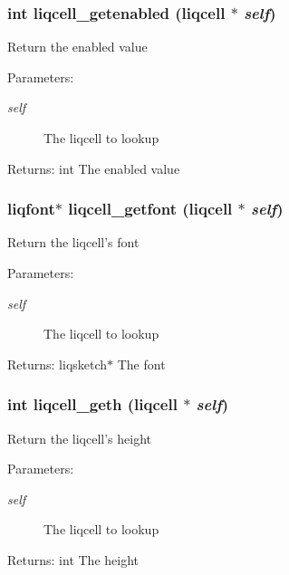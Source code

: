 \subsubsection[{liqcell\_\-getenabled}]{\setlength{\rightskip}{0pt plus 5cm}int liqcell\_\-getenabled (liqcell $\ast$ {\em self})}\label{d5/da2/liqcell_8c_1055023770b26ad7f54e37c5f8e201f5}


Return the enabled value \begin{Desc}
\item[Parameters:]
\begin{description}
\item[{\em self}]The liqcell to lookup \end{description}
\end{Desc}
\begin{Desc}
\item[Returns:]int The enabled value \end{Desc}
\subsubsection[{liqcell\_\-getfont}]{\setlength{\rightskip}{0pt plus 5cm}liqfont$\ast$ liqcell\_\-getfont (liqcell $\ast$ {\em self})}\label{d5/da2/liqcell_8c_4ba91871716343808c65b19ca8ae9ae4}


Return the liqcell's font \begin{Desc}
\item[Parameters:]
\begin{description}
\item[{\em self}]The liqcell to lookup \end{description}
\end{Desc}
\begin{Desc}
\item[Returns:]liqsketch$\ast$ The font \end{Desc}
\subsubsection[{liqcell\_\-geth}]{\setlength{\rightskip}{0pt plus 5cm}int liqcell\_\-geth (liqcell $\ast$ {\em self})}\label{d5/da2/liqcell_8c_f0cc7745df16dd960ea27475728afeef}


Return the liqcell's height \begin{Desc}
\item[Parameters:]
\begin{description}
\item[{\em self}]The liqcell to lookup \end{description}
\end{Desc}
\begin{Desc}
\item[Returns:]int The height \end{Desc}


